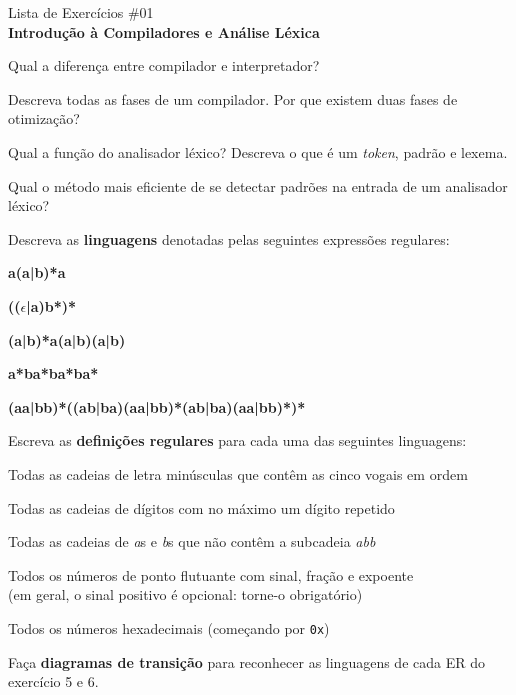 \documentclass{compiladores}
\begin{document}
\begin{center}
{\LARGE Lista de Exercícios \#01}\\
{\bf Introdução à Compiladores e Análise Léxica}
\end{center}

\begin{listanumerada}
\item
Qual a diferença entre compilador e interpretador?

\item
Descreva todas as fases de um compilador. Por que existem duas fases de otimização?

\item
Qual a função do analisador léxico? Descreva o que é um \emph{token}, padrão e lexema.

\item
Qual o método mais eficiente de se detectar padrões na entrada de um analisador léxico?


\item
Descreva as {\bf linguagens} denotadas pelas seguintes expressões regulares:
\begin{lista}
  \item {\bf a(a|b)*a}
  \item {\bf (($\epsilon$|a)b*)*}
  \item {\bf (a|b)*a(a|b)(a|b)}
  \item {\bf a*ba*ba*ba*}
  \item {\bf (aa|bb)*((ab|ba)(aa|bb)*(ab|ba)(aa|bb)*)*}
\end{lista}

\item
Escreva as {\bf definições regulares} para cada uma das seguintes linguagens:
\begin{lista}
  \item Todas as cadeias de letra minúsculas que contêm as cinco vogais em ordem
  \item Todas as cadeias de dígitos com no máximo um dígito repetido
  \item Todas as cadeias de \emph{a}s e \emph{b}s que não contêm a subcadeia \emph{abb}
  \item Todos os números de ponto flutuante com sinal, fração e expoente \\
        (em geral, o sinal positivo é opcional: torne-o obrigatório)
  \item Todos os números hexadecimais (começando por \texttt{0x})
\end{lista}

\item
Faça {\bf diagramas de transição} para reconhecer as linguagens de
cada ER do exercício 5 e 6.


\end{listanumerada}
\end{document}
